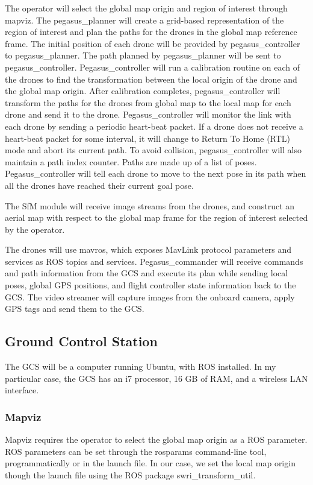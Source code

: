 The operator will select the global map origin and region of interest through mapviz. The pegasus\_planner will create a grid-based representation of the region of interest and plan the paths for the drones in the global map reference frame. The initial position of each drone will be provided by pegasus\_controller  to pegasus\_planner. The path planned by pegasus\_planner will be sent to pegasus\_controller. Pegasus\_controller will run a calibration routine on each of the drones to find the transformation between the local origin of the drone and the global map origin. After calibration completes, pegasus\_controller will transform the paths for the drones from global map to the local map for each drone and send it to the drone. Pegasus\_controller will monitor the link with each drone by sending a periodic heart-beat packet. If a drone does not receive a heart-beat packet for some interval, it will change to Return To Home (RTL) mode and abort its current path. To avoid collision, pegasus\_controller will also maintain a path index counter. Paths are made up of a list of poses. Pegasus\_controller will tell each drone to move to the next pose in its path when all the drones have reached their current goal pose.

The SfM module will receive image streams from the drones, and construct an aerial map with respect to the global map frame for the region of interest selected by the operator.

The drones will use mavros, which exposes MavLink protocol parameters and services as ROS topics and services. Pegasus\_commander will receive commands and path information from the GCS and execute its plan while sending local poses, global GPS positions, and flight controller state information back to the GCS. The video streamer will capture images from the onboard camera, apply GPS tags and send them to the GCS.

\subsection{Ground Control Station}

The GCS will be a computer running Ubuntu, with ROS installed. In my particular case, the GCS has an i7 processor, 16 GB of RAM, and a wireless LAN interface.

\subsubsection{Mapviz}
Mapviz requires the operator to select the global map origin as a ROS parameter. ROS parameters can be set through the rosparams command-line tool, programmatically or in the launch file. In our case, we set the local map origin though the launch file using the ROS package swri\_transform\_util.

